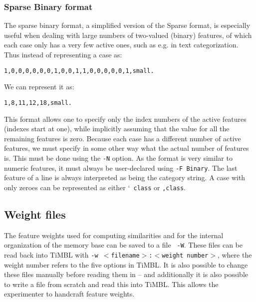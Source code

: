 \documentclass{report}
\begin{document}
\subsubsection{Sparse Binary format}
\label{binaryformat}

The sparse binary format, a simplified version of the Sparse format,
is especially useful when dealing with large numbers of two-valued
(binary) features, of which each case only has a very few active ones,
such as e.g. in text categorization. Thus instead of representing a
case as:

\begin{footnotesize}
\begin{verbatim}
1,0,0,0,0,0,0,1,0,0,1,1,0,0,0,0,0,1,small.
\end{verbatim}
\end{footnotesize}

We can represent it as:

\begin{footnotesize}
\begin{verbatim}
1,8,11,12,18,small.
\end{verbatim}
\end{footnotesize}

This format allows one to specify only the index numbers of the active
features (indexes start at one), while implicitly assuming that the
value for all the remaining features is zero. Because each case has a
different number of active features, we must specify in some other way
what the actual number of features is. This must be done using the
{\tt -N} option.  As the format is very similar to numeric features,
it must always be user-declared using {\tt -F Binary}. The last
feature of a line is always interpreted as being the category
string. A case with only zeroes can be represented as either `{\tt
class} or {\tt ,class}.

\subsection{Weight files}
\label{weightformat}

The feature weights used for computing similarities and for the
internal organization of the memory base can be saved to a file {\tt
  -W}. These files can be read back into TiMBL with {\tt -w
  $<$filename$>$:$<$weight number$>$}, where the weight number refers to the
five options in TiMBL. It is also possible to change these files
manually before reading them in -- and additionally it is also
possible to write a file from scratch and read this into TiMBL. This
allows the experimenter to handcraft feature weights.
\end{document}
